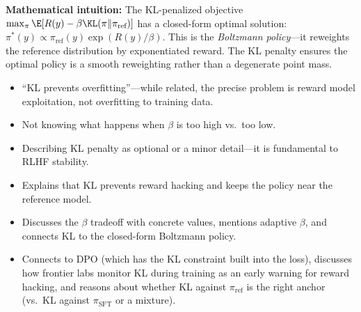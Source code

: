 \begin{interviewq}
\textbf{Mathematical intuition:} The KL-penalized objective $\max_\pi \E[R(y) - \beta \KL(\pi \| \pi_{\text{ref}})]$ has a closed-form optimal solution: $\pi^*(y) \propto \pi_{\text{ref}}(y) \exp(R(y)/\beta)$. This is the \textit{Boltzmann policy}---it reweights the reference distribution by exponentiated reward. The KL penalty ensures the optimal policy is a smooth reweighting rather than a degenerate point mass.

\redflags
\begin{itemize}
    \item ``KL prevents overfitting''---while related, the precise problem is reward model exploitation, not overfitting to training data.
    \item Not knowing what happens when $\beta$ is too high vs.\ too low.
    \item Describing KL penalty as optional or a minor detail---it is fundamental to RLHF stability.
\end{itemize}


\goodgreat
\begin{itemize}
    \item {} Explains that KL prevents reward hacking and keeps the policy near the reference model.
    \item {} Discusses the $\beta$ tradeoff with concrete values, mentions adaptive $\beta$, and connects KL to the closed-form Boltzmann policy.
    \item {} Connects to DPO (which has the KL constraint built into the loss), discusses how frontier labs monitor KL during training as an early warning for reward hacking, and reasons about whether KL against $\pi_{\text{ref}}$ is the right anchor (vs.\ KL against $\pi_{\text{SFT}}$ or a mixture).
\end{itemize}

\end{interviewq}


